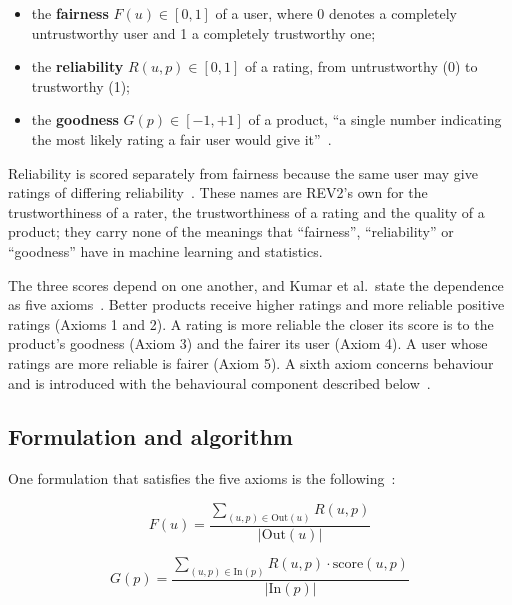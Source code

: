 \begin{itemize}
    \item the \textbf{\gls{fairness}} $F(u) \in [0, 1]$ of a user, where 0 denotes a completely untrustworthy user and 1 a completely trustworthy one;
    \item the \textbf{\gls{reliability}} $R(u, p) \in [0, 1]$ of a rating, from untrustworthy (0) to trustworthy (1);
    \item the \textbf{\gls{goodness}} $G(p) \in [-1, +1]$ of a product, \enquote{a single number indicating the most likely rating a fair user would give it}~\cite[p.~335]{Kumar2018}.
\end{itemize}

Reliability is scored separately from fairness because the same user may give ratings of differing reliability~\cite[p.~335]{Kumar2018}. These names are REV2's own for the trustworthiness of a rater, the trustworthiness of a rating and the quality of a product; they carry none of the meanings that \enquote{fairness}, \enquote{reliability} or \enquote{goodness} have in machine learning and statistics.

The three scores depend on one another, and Kumar et al.\ state the dependence as five axioms~\cite[pp.~335--336]{Kumar2018}. Better products receive higher ratings and more reliable positive ratings (Axioms 1 and 2). A rating is more reliable the closer its score is to the product's goodness (Axiom 3) and the fairer its user (Axiom 4). A user whose ratings are more reliable is fairer (Axiom 5). A sixth axiom concerns behaviour and is introduced with the behavioural component described below~\cite[p.~337]{Kumar2018}.

\subsection{Formulation and algorithm}\label{sec:rev2-algorithm}

One formulation that satisfies the five axioms is the following~\cite[p.~336]{Kumar2018}:

\begin{equation}\label{eq:fairness}
  F(u) = \frac{\sum_{(u,p)\in \mathrm{Out}(u)} R(u,p)}{\lvert\mathrm{Out}(u)\rvert}
\end{equation}

\begin{equation}\label{eq:goodness}
  G(p) = \frac{\sum_{(u,p)\in \mathrm{In}(p)} R(u,p)\cdot \mathrm{score}(u,p)}{\lvert\mathrm{In}(p)\rvert}
\end{equation}

